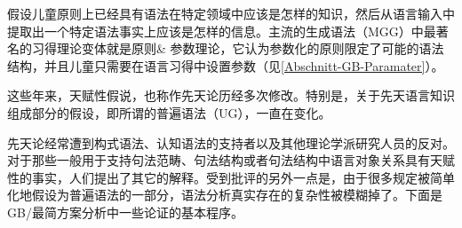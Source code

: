  \citet[]{Chomsky65a}假设儿童原则上已经具有语法在特定领域中应该是怎样的知识，然后从语言输入中提取出一个特定语法事实上应该是怎样的信息。主流的生成语法（MGG）中最著名的习得理论变体就是原则\& 参数理论，它认为参数化的原则限定了可能的语法结构，并且儿童只需要在语言习得中设置参数（见\ref{Abschnitt-GB-Paramater}）。

这些年来，天赋性假说，也称作先天论历经多次修改。特别是，关于先天语言知识组成部分的假设，即所谓的普遍语法（UG），一直在变化。

先天论经常遭到构式语法\indexcxgc、认知语法的支持者以及其他理论学派研究人员的反对。对于那些一般用于支持句法范畴、句法结构或者句法结构中语言对象关系具有天赋性的事实，人们提出了其它的解释。受到批评的另外一点是，由于很多规定被简单化地假设为普遍语法的一部分，语法分析真实存在的复杂性被模糊掉了。下面是GB/最简方案分析中一些论证的基本程序。


